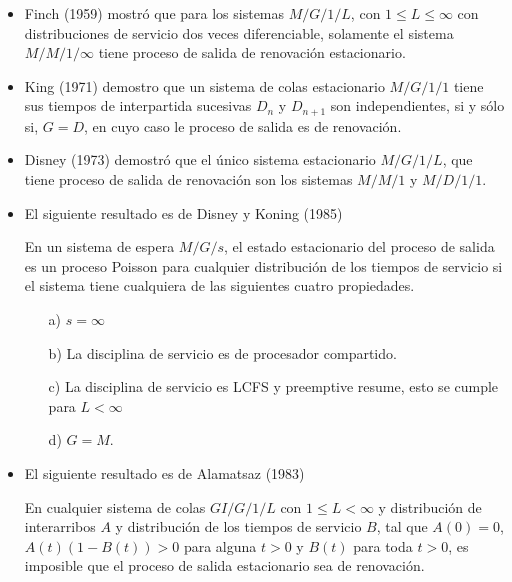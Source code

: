 \begin{itemize}
\item Finch (1959) mostr\'o que para los sistemas $M/G/1/L$, con $1\leq L\leq \infty$ con distribuciones de servicio dos veces diferenciable, solamente el sistema $M/M/1/\infty$ tiene proceso de salida de renovaci\'on estacionario.

\item King (1971) demostro que un sistema de colas estacionario $M/G/1/1$ tiene sus tiempos de interpartida sucesivas $D_{n}$ y $D_{n+1}$ son independientes, si y s\'olo si, $G=D$, en cuyo caso le proceso de salida es de renovaci\'on.

\item Disney (1973) demostr\'o que el \'unico sistema estacionario $M/G/1/L$, que tiene proceso de salida de renovaci\'on  son los sistemas $M/M/1$ y $M/D/1/1$.



\item El siguiente resultado es de Disney y Koning (1985)
\begin{Teo}
En un sistema de espera $M/G/s$, el estado estacionario del proceso de salida es un proceso Poisson para cualquier distribuci\'on de los tiempos de servicio si el sistema tiene cualquiera de las siguientes cuatro propiedades.

\begin{itemize}
\item[a)] $s=\infty$
\item[b)] La disciplina de servicio es de procesador compartido.
\item[c)] La disciplina de servicio es LCFS y preemptive resume, esto se cumple para $L<\infty$
\item[d)] $G=M$.
\end{itemize}

\end{Teo}

\item El siguiente resultado es de Alamatsaz (1983)

\begin{Teo}
En cualquier sistema de colas $GI/G/1/L$ con $1\leq L<\infty$ y distribuci\'on de interarribos $A$ y distribuci\'on de los tiempos de servicio $B$, tal que $A\left(0\right)=0$, $A\left(t\right)\left(1-B\left(t\right)\right)>0$ para alguna $t>0$ y $B\left(t\right)$ para toda $t>0$, es imposible que el proceso de salida estacionario sea de renovaci\'on.
\end{Teo}

\end{itemize}



